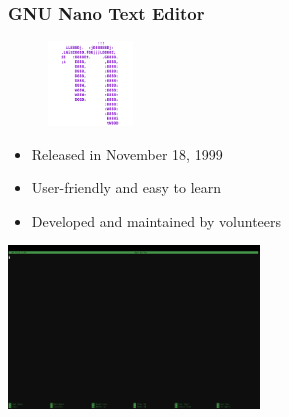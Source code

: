 \documentclass{beamer}
\begin{document}
\begin{frame}
	\frametitle{\textbf{GNU Nano Text Editor}}
		
	\begin{multicols}{2}
		\begin{figure}[h]
			\centering
			\includegraphics[width=0.2\textwidth]{img/nano_logo.png} 
		\end{figure}

		\begin{itemize}
			\item Released in November 18, 1999
			\item User-friendly and easy to learn 
			\item Developed and maintained by volunteers
		\end{itemize}

		\includegraphics[width=0.5\textwidth]{img/nano.png} 
	\end{multicols}

\end{frame}
\end{document}
